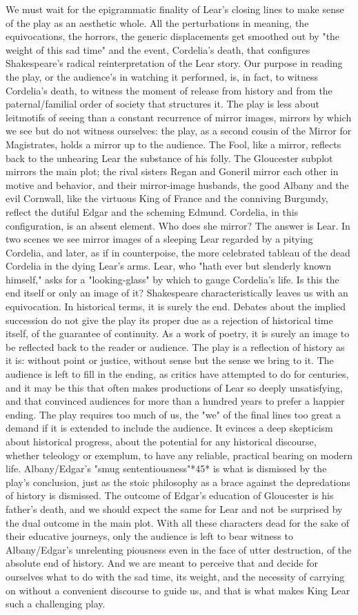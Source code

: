 	We must wait for the epigrammatic finality of Lear's closing lines to make sense of the play as an aesthetic whole. All the perturbations in meaning, the equivocations, the horrors, the generic displacements get smoothed out by "the weight of this sad time" and the event, Cordelia's death, that configures Shakespeare's radical reinterpretation of the Lear story. Our purpose in reading the play, or the audience's in watching it performed, is, in fact, to witness Cordelia's death, to witness the moment of release from history and from the paternal/familial order of society that structures it. The play is less about leitmotifs of seeing than a constant recurrence of mirror images, mirrors by which we see but do not witness ourselves: the play, as a second cousin of the Mirror for Magistrates, holds a mirror up to the audience. The Fool, like a mirror, reflects back to the unhearing Lear the substance of his folly. The Gloucester subplot mirrors the main plot; the rival sisters Regan and Goneril mirror each other in motive and behavior, and their mirror-image husbands, the good Albany and the evil Cornwall, like the virtuous King of France and the conniving Burgundy, reflect the dutiful Edgar and the scheming Edmund. Cordelia, in this configuration, is an absent element. Who does she mirror? The answer is Lear. In two scenes we see mirror images of a sleeping Lear regarded by a pitying Cordelia, and later,  as if in counterpoise, the more celebrated tableau of the dead Cordelia in the dying Lear's arms. Lear, who "hath ever but slenderly known himself," asks for a "looking-glass" by which to gauge Cordelia's life. Is this the end itself or only an image of it? Shakespeare characteristically leaves us with an equivocation. In historical terms, it is surely the end. Debates about the implied succession do not give the play its proper due as a rejection of historical time itself, of the guarantee of continuity. As a work of poetry, it is surely an image to be reflected back to the reader or audience. The play is a reflection of history as it is: without point or justice, without sense but the sense we bring to it. The audience is left to fill in the ending, as critics have attempted to do for centuries, and it may be this that often makes productions of Lear so deeply unsatisfying, and  that convinced audiences for more than a hundred years to prefer a happier ending. The play requires too much of us, the "we" of the final lines too great a demand if it is extended to include the audience. It evinces a deep skepticism about historical progress, about the potential for any historical discourse, whether teleology or exemplum, to have any reliable, practical bearing on modern life. Albany/Edgar's "smug sententiousness"*45* is what is dismissed by the play's conclusion, just as the stoic philosophy as a brace against the depredations of history is dismissed. The outcome of Edgar's education of Gloucester is his father's death, and we should expect the same for Lear and not be surprised by the dual outcome in the main plot. With all these characters dead for the sake of their educative journeys, only the audience is left to bear witness to Albany/Edgar's unrelenting piousness even in the face of utter destruction, of the absolute end of history. And we are meant to perceive that and decide for ourselves what to do with the sad time, its weight, and the necessity of carrying on without a convenient discourse to guide us, and that is what makes King Lear such a challenging play.
